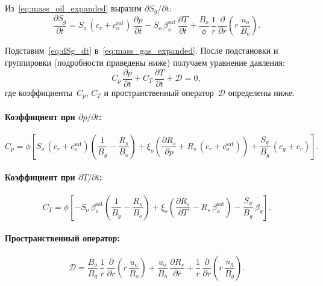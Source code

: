 \documentclass[12pt,a4paper]{article}
\begin{document}
Из~\eqref{eq:mass_oil_expanded} выразим $\partial S_g/\partial t$:
\begin{equation}\label{eq:dSg_dt}
  \frac{\partial S_g}{\partial t}
  = S_o\,(c_r + c_o^{\mathrm{sat}})\,\frac{\partial p}{\partial t}
    - S_o\,\beta_o^{\mathrm{sat}}\,\frac{\partial T}{\partial t}
    + \frac{B_o}{\phi}\,\frac{1}{r}\,\frac{\partial}{\partial r}\!
      \left(r\,\frac{u_o}{B_o}\right).
\end{equation}

Подставим~\eqref{eq:dSg_dt} в~\eqref{eq:mass_gas_expanded}.
После подстановки и группировки (подробности приведены ниже) получаем
уравнение давления:
\begin{equation}\label{eq:pressure}
  \boxed{
    C_p\,\frac{\partial p}{\partial t}
    + C_T\,\frac{\partial T}{\partial t}
    + \mathcal{D} = 0,
  }
\end{equation}
где коэффициенты~$C_p$, $C_T$ и пространственный оператор~$\mathcal{D}$
определены ниже.

\paragraph{Коэффициент при $\partial p/\partial t$:}
\begin{equation}\label{eq:Cp}
  C_p = \phi\!\left[
    S_o\,(c_r + c_o^{\mathrm{sat}})\!\left(\frac{1}{B_g} - \frac{R_s}{B_o}\right)
    + \xi_o\!\left(\frac{\partial R_s}{\partial p}
      + R_s\,(c_r + c_o^{\mathrm{sat}})\right)
    + \frac{S_g}{B_g}\,(c_g + c_r)
  \right].
\end{equation}

\paragraph{Коэффициент при $\partial T/\partial t$:}
\begin{equation}\label{eq:CT}
  C_T = \phi\!\left[
    -S_o\,\beta_o^{\mathrm{sat}}\!\left(\frac{1}{B_g} - \frac{R_s}{B_o}\right)
    + \xi_o\!\left(\frac{\partial R_s}{\partial T}
      - R_s\,\beta_o^{\mathrm{sat}}\right)
    - \frac{S_g}{B_g}\,\beta_g
  \right].
\end{equation}

\paragraph{Пространственный оператор:}
\begin{equation}\label{eq:D_operator}
  \mathcal{D} = \frac{B_o}{B_g}\,\frac{1}{r}\,
    \frac{\partial}{\partial r}\!\left(r\,\frac{u_o}{B_o}\right)
    + \frac{u_o}{B_o}\,\frac{\partial R_s}{\partial r}
    + \frac{1}{r}\,\frac{\partial}{\partial r}\!
      \left(r\,\frac{u_g}{B_g}\right).
\end{equation}
\end{document}

